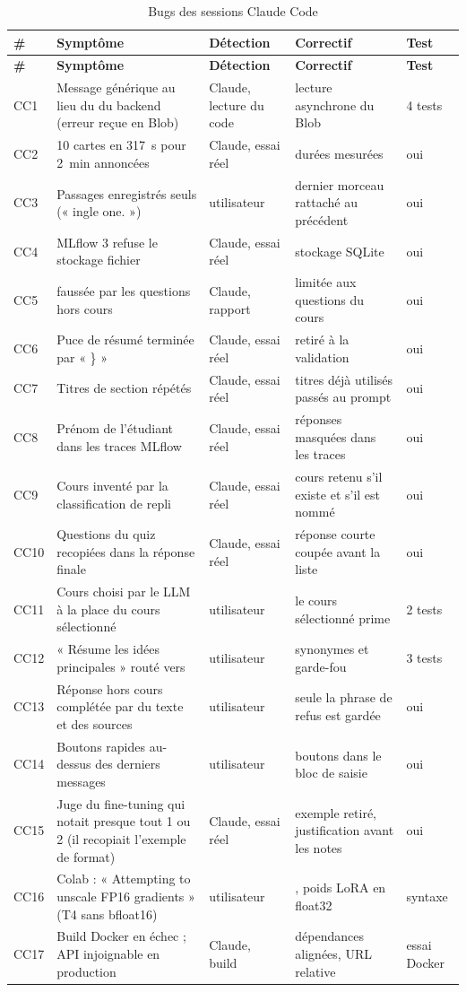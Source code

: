 \documentclass[12pt,a4paper]{report}
\DeclareRobustCommand{\code}[1]{\texttt{\codecasse{#1}}}
\begin{document}
\begin{longtable}{@{}P{1.2cm}P{4.3cm}P{2.5cm}P{3.8cm}P{2.1cm}@{}}
\caption{Bugs des sessions Claude Code}
\label{tab:bugs-cc}\\
\toprule
\textbf{\#} & \textbf{Symptôme} & \textbf{Détection} & \textbf{Correctif} & \textbf{Test} \\
\midrule
\endfirsthead
\toprule
\textbf{\#} & \textbf{Symptôme} & \textbf{Détection} & \textbf{Correctif} & \textbf{Test} \\
\midrule
\endhead
CC1 & Message générique au lieu du \code{detail} du backend (erreur reçue en Blob) & Claude, lecture du code & lecture asynchrone du Blob & 4 tests \\
CC2 & 10 cartes en 317~s pour 2~min annoncées & Claude, essai réel & durées mesurées & oui \\
CC3 & Passages enregistrés seuls (« ingle one. ») & utilisateur & dernier morceau rattaché au précédent & oui \\
CC4 & MLflow 3 refuse le stockage fichier & Claude, essai réel & stockage SQLite & oui \\
CC5 & \code{reponse_trouvee} faussée par les questions hors cours & Claude, rapport & limitée aux questions du cours & oui \\
CC6 & Puce de résumé terminée par « \} » & Claude, essai réel & retiré à la validation & oui \\
CC7 & Titres de section répétés & Claude, essai réel & titres déjà utilisés passés au prompt & oui \\
CC8 & Prénom de l'étudiant dans les traces MLflow & Claude, essai réel & réponses masquées dans les traces & oui \\
CC9 & Cours inventé par la classification de repli & Claude, essai réel & cours retenu s'il existe et s'il est nommé & oui \\
CC10 & Questions du quiz recopiées dans la réponse finale & Claude, essai réel & réponse courte coupée avant la liste & oui \\
CC11 & Cours choisi par le LLM à la place du cours sélectionné & utilisateur & le cours sélectionné prime & 2 tests \\
CC12 & « Résume les idées principales » routé vers \code{ask_course} & utilisateur & synonymes et garde-fou & 3 tests \\
CC13 & Réponse hors cours complétée par du texte et des sources & utilisateur & seule la phrase de refus est gardée & oui \\
CC14 & Boutons rapides au-dessus des derniers messages & utilisateur & boutons dans le bloc de saisie & oui \\
CC15 & Juge du fine-tuning qui notait presque tout 1 ou 2 (il recopiait l'exemple de format) & Claude, essai réel & exemple retiré, justification avant les notes & oui \\
CC16 & Colab : « Attempting to unscale FP16 gradients » (T4 sans bfloat16) & utilisateur & \code{bf16=False}, poids LoRA en float32 & syntaxe \\
CC17 & Build Docker en échec ; API injoignable en production & Claude, build & dépendances alignées, URL relative & essai Docker \\
\bottomrule
\end{longtable}
\end{document}
